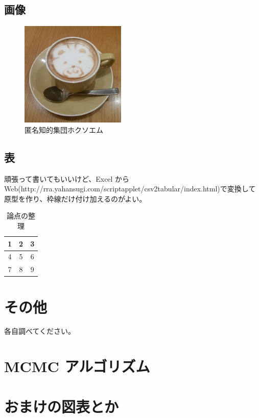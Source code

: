 \documentclass[11pt]{jsarticle}
\begin{document}
\subsection{画像}
\begin{figure}[htbp] %
 \centering
 \includegraphics[width=5cm]{./img/favicon.png}
  \caption{匿名知的集団ホクソエム}
  \label{fig:favicon}
\end{figure}

\subsection{表}
頑張って書いてもいいけど、Excel から Web(http://rra.yahansugi.com/scriptapplet/csv2tabular/index.html)で変換して原型を作り、枠線だけ付け加えるのがよい。


\begin{table}[htbp]
  \centering
  \caption{論点の整理}
 \begin{tabular}{c|c|c}
  1 & 2 & 3 \\ \hline
  4 & 5 & 6 \\
  7 & 8 & 9
 \end{tabular}
\end{table}

\section{その他}
各自調べてください。


\newpage
\appendix %
\section{MCMC アルゴリズム}

\section{おまけの図表とか}

\newpage



\end{document}
